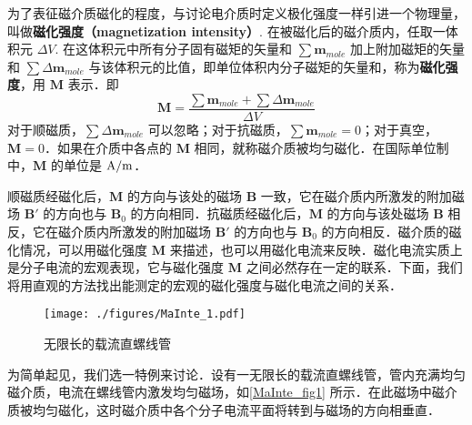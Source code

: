 
为了表征磁介质磁化的程度，与讨论电介质时定义极化强度一样引进一个物理量，叫做\textbf{磁化强度（magnetization intensity）}. 在被磁化后的磁介质内，任取一体积元 $\Delta V$. 在这体积元中所有分子固有磁矩的矢量和 $\sum \mathbf{m}_{mole}$ 加上附加磁矩的矢量和 $\sum \Delta\mathbf{m}_{mole}$ 与该体积元的比值，即单位体积内分子磁矩的矢量和，称为\textbf{磁化强度}，用 $\mathbf M$ 表示．即
\begin{equation}\label{MaInte_eq2}
\mathbf M=\frac{\sum \mathbf m_{mole}+\sum \Delta \mathbf m_{mole}}{\Delta V}
\end{equation}
对于顺磁质，$\sum \Delta\mathbf{m}_{mole}$ 可以忽略；对于抗磁质，$\sum \mathbf{m}_{mole}=0$；对于真空，$\mathbf M=0$．如果在介质中各点的 $\mathbf M $ 相同，就称磁介质被均匀磁化．在国际单位制中，$\mathbf M$ 的单位是 $\rm A/m$．

顺磁质经磁化后，$\mathbf M $ 的方向与该处的磁场 $\mathbf B $ 一致，它在磁介质内所激发的附加磁场 $\mathbf B' $ 的方向也与 $\mathbf B_0$ 的方向相同．抗磁质经磁化后，$\mathbf M $ 的方向与该处磁场 $\mathbf B $ 相反，它在磁介质内所激发的附加磁场 $\mathbf B' $ 的方向也与 $\mathbf B_0 $ 的方向相反．磁介质的磁化情况，可以用磁化强度 $\mathbf M $ 来描述，也可以用磁化电流来反映．磁化电流实质上是分子电流的宏观表现，它与磁化强度 $\mathbf M $ 之间必然存在一定的联系．下面，我们将用直观的方法找出能测定的宏观的磁化强度与磁化电流之间的关系．
\begin{figure}[ht]
\centering
\texttt{[image: ./figures/MaInte\_1.pdf]}
\caption{无限长的载流直螺线管} \label{MaInte_fig1}
\end{figure}
为简单起见，我们选一特例来讨论．设有一无限长的载流直螺线管，管内充满均匀磁介质，电流在螺线管内激发均匀磁场，如\autoref{MaInte_fig1} 所示．在此磁场中磁介质被均匀磁化，这时磁介质中各个分子电流平面将转到与磁场的方向相垂直．

